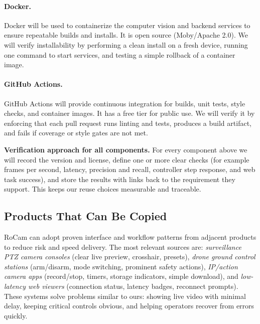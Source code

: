 \documentclass[12pt]{article}
\begin{document}
\paragraph{Docker.}
Docker will be used to containerize the computer vision and backend services to
ensure repeatable builds and installs. It is open source (Moby/Apache 2.0). We
will verify installability by performing a clean install on a fresh device,
running one command to start services, and testing a simple rollback of a
container image.

\paragraph{GitHub Actions.}
GitHub Actions will provide continuous integration for builds, unit tests,
style checks, and container images. It has a free tier for public use. We will
verify it by enforcing that each pull request runs linting and tests, produces
a build artifact, and fails if coverage or style gates are not met.

\medskip
\noindent\textbf{Verification approach for all components.}
For every component above we will record the version and license, define one or more clear checks (for example frames per second, latency, precision and recall, controller step response, and web task success), and store the results with links back to the requirement they support. This keeps our reuse choices measurable and traceable.


\subsection{Products That Can Be Copied}
\label{sec:products-that-can-be-copied}

RoCam can adopt proven interface and workflow patterns from adjacent products
to reduce risk and speed delivery. The most relevant sources are:
\textit{surveillance PTZ camera consoles} (clear live preview, crosshair,
presets), \textit{drone ground control stations} (arm/disarm, mode switching,
prominent safety actions), \textit{IP/action camera apps} (record/stop, timers,
storage indicators, simple download), and \textit{low-latency web viewers}
(connection status, latency badges, reconnect prompts). These systems solve
problems similar to ours: showing live video with minimal delay, keeping
critical controls obvious, and helping operators recover from errors quickly.
\end{document}
